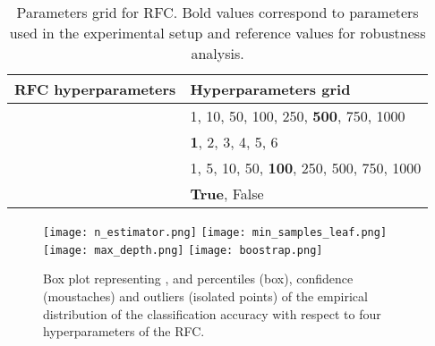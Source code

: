 \documentclass{article}
\begin{document}
\begin{table}
    \centering
    \renewcommand{\arraystretch}{1.2}
    \begin{tabular}[t]{l|l}
    
        RFC hyperparameters     & Hyperparameters grid \\
        \hline
                 &1, 10, 50, 100, 250, \textbf{500}, 750, 1000      \\
            & \textbf{1}, 2, 3, 4, 5, 6 \\
                    & 1, 5, 10, 50, \textbf{100}, 250, 500, 750, 1000 \\
                      & \textbf{True}, False \\

    \end{tabular}
    
    \caption{Parameters grid for RFC. Bold values correspond to parameters used in the experimental setup and reference values for robustness analysis.}
    \label{tab:grid_para}
\end{table}


\begin{figure}
    \begin{center}
        \texttt{[image: n\_estimator.png]}
        \texttt{[image: min\_samples\_leaf.png]} \\
        \texttt{[image: max\_depth.png]}
        \texttt{[image: boostrap.png]} \\
    \end{center}

    \caption{Box plot representing ,  and  percentiles (box), confidence (moustaches) and outliers (isolated points) of the empirical distribution of the classification accuracy with respect to four hyperparameters of the RFC.}
    \label{fig:hp_sensitivity}
\end{figure}
\end{document}
